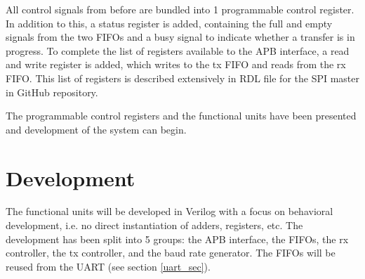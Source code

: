 \documentclass[./dissertation.tex]{subfiles}
\begin{document}
All control signals from before are bundled into 1 programmable control register. In addition to this, a status register is added, containing the full and empty signals from the two FIFOs and a busy signal to indicate whether a transfer is in progress. To complete the list of registers available to the APB interface, a read and write register is added, which writes to the tx FIFO and reads from the rx FIFO. This list of registers is described extensively in RDL file for the SPI master in GitHub repository.

The programmable control registers and the functional units have been presented and development of the system can begin.

\section{Development}
The functional units will be developed in Verilog with a focus on behavioral development, i.e. no direct instantiation of adders, registers, etc. The development has been split into 5 groups: the APB interface, the FIFOs, the rx controller, the tx controller, and the baud rate generator. The FIFOs will be reused from the UART (see section \ref{uart_sec}). 
\end{document}
